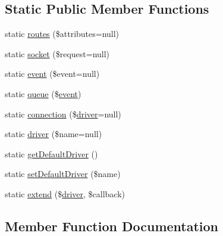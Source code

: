 \subsection*{Static Public Member Functions}
\begin{DoxyCompactItemize}
\item 
static \mbox{\hyperlink{class_illuminate_1_1_support_1_1_facades_1_1_broadcast_a7b01f8f6feddd98350be0def6f2ec6fd}{routes}} (\$attributes=null)
\item 
static \mbox{\hyperlink{class_illuminate_1_1_support_1_1_facades_1_1_broadcast_a6a4b121169824b3e5153107ad3d98044}{socket}} (\$request=null)
\item 
static \mbox{\hyperlink{class_illuminate_1_1_support_1_1_facades_1_1_broadcast_af0187828ad8e637972903b98eb345b70}{event}} (\$event=null)
\item 
static \mbox{\hyperlink{class_illuminate_1_1_support_1_1_facades_1_1_broadcast_a25f11be8ae7dd784f6b7f0930fcb8ef1}{queue}} (\$\mbox{\hyperlink{class_illuminate_1_1_support_1_1_facades_1_1_broadcast_af0187828ad8e637972903b98eb345b70}{event}})
\item 
static \mbox{\hyperlink{class_illuminate_1_1_support_1_1_facades_1_1_broadcast_ab5a3d97c5bad4cb46537b4396e93bc2b}{connection}} (\$\mbox{\hyperlink{class_illuminate_1_1_support_1_1_facades_1_1_broadcast_a9bdbd5d1fd001e1a5ef02b4003f8d552}{driver}}=null)
\item 
static \mbox{\hyperlink{class_illuminate_1_1_support_1_1_facades_1_1_broadcast_a9bdbd5d1fd001e1a5ef02b4003f8d552}{driver}} (\$name=null)
\item 
static \mbox{\hyperlink{class_illuminate_1_1_support_1_1_facades_1_1_broadcast_a38fa0a82b75503dddc1675b02644ba10}{get\+Default\+Driver}} ()
\item 
static \mbox{\hyperlink{class_illuminate_1_1_support_1_1_facades_1_1_broadcast_ae7f1533413aa1c6235a5d581f042656f}{set\+Default\+Driver}} (\$name)
\item 
static \mbox{\hyperlink{class_illuminate_1_1_support_1_1_facades_1_1_broadcast_a644492e0fbd34d13c70db1692e1d01b0}{extend}} (\$\mbox{\hyperlink{class_illuminate_1_1_support_1_1_facades_1_1_broadcast_a9bdbd5d1fd001e1a5ef02b4003f8d552}{driver}}, \$callback)
\end{DoxyCompactItemize}


\subsection{Member Function Documentation}
\mbox{\label{class_illuminate_1_1_support_1_1_facades_1_1_broadcast_ab5a3d97c5bad4cb46537b4396e93bc2b}} 
